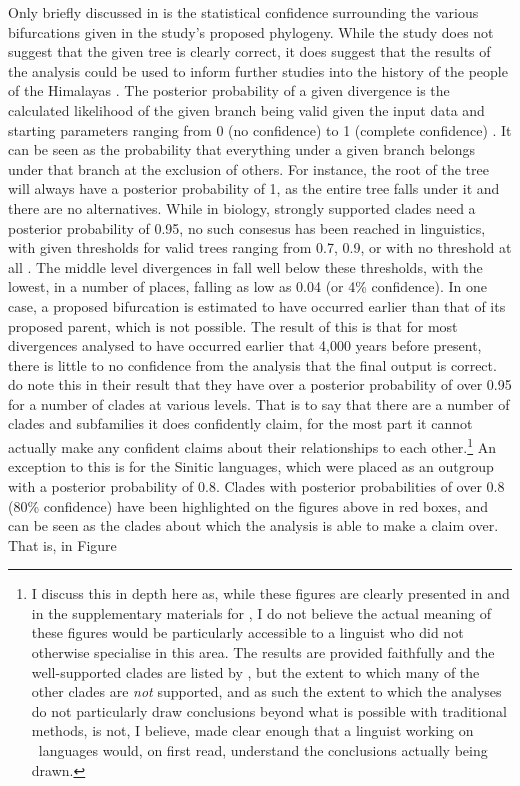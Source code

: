 Only briefly discussed in  is the statistical confidence surrounding the various bifurcations given in the study's proposed phylogeny. While the study does not suggest that the given tree is clearly correct, it does suggest that the results of the analysis could be used to inform further studies into the history of the people of the Himalayas \cite[5]{ZhangH2020Baye}. The posterior probability of a given divergence is the calculated likelihood of the given branch being valid given the input data and starting parameters ranging from 0 (no  confidence) to 1 (complete confidence) \cite{Alfaro2006}. It can be seen as the probability that everything under a given branch belongs under that branch at the exclusion of others. For instance, the root of the tree will always have a posterior probability of 1, as the entire tree falls under it and there are no alternatives. While in biology, strongly supported clades need a posterior probability of 0.95, no such consesus has been reached in linguistics, with given thresholds for valid trees ranging from 0.7, 0.9, or with no threshold at all \cite{Dolin2022}. The middle level divergences in  fall well below these thresholds, with the lowest, in a number of places, falling as low as 0.04 (or 4\% confidence). In one case, a proposed bifurcation is estimated to have occurred earlier than that of its proposed parent, which is not possible. The result of this is that for most divergences analysed to have occurred earlier that 4,000 years before present, there is little to no confidence from the analysis that the final output is correct.  do note this in their result that they have over a posterior probability of over 0.95 for a number of clades at various levels. That is to say that there are a number of clades and subfamilies it does confidently claim, for the most part it cannot actually make any confident claims about their relationships to each other.\footnote{I discuss this in depth here as, while these figures are clearly presented in  and in the supplementary materials for , I do not believe the actual meaning of these figures would be particularly accessible to a linguist who did not otherwise specialise in this area. The results are provided faithfully and the well-supported clades are listed by , but the extent to which many of the other clades are \textit{not} supported, and as such the extent to which the analyses do not particularly draw conclusions beyond what is possible with traditional methods, is not, I believe, made clear enough that a linguist working on \lfam\ languages would, on first read, understand the conclusions actually being drawn.} An exception to this is for the Sinitic languages, which were placed as an outgroup with a posterior probability of 0.8. Clades with posterior probabilities of over 0.8 (80\% confidence) have been highlighted on the figures above in red boxes, and can be seen as the clades about which the analysis is able to make a claim over. That is, in Figure 
